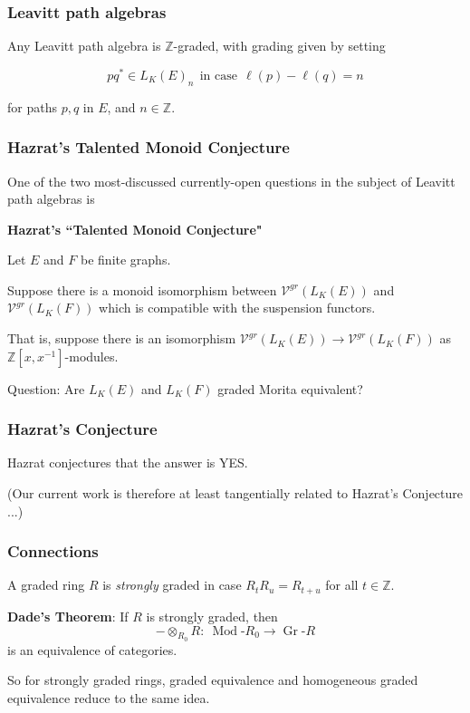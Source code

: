 \documentclass{beamer}
\newcommand{\rmod}[1]{\operatorname{Mod}\text{-}#1}
\newcommand{\grmod}[1]{\operatorname{Gr}\text{-}#1}
\begin{document}
\begin{frame}
\frametitle{Leavitt path algebras}


Any Leavitt path algebra is $\mathbb{Z}$-graded, with grading given by setting

$$pq^* \in L_K(E)_n \ \ \mbox{in case} \ \ \ell(p) - \ell(q) = n$$

\smallskip

for paths $p,q$ in $E$, and $n\in \mathbb{Z}$.  

\end{frame}



\begin{frame}
\frametitle{Hazrat's Talented Monoid Conjecture}

One of the two most-discussed currently-open questions in the subject of Leavitt path algebras is 
\begin{center}
{\bf Hazrat's ``Talented Monoid Conjecture"}
\end{center}
Let $E$ and $F$ be finite graphs.  

\medskip

Suppose there is a monoid isomorphism between $\mathcal{V}^{gr}(L_K(E))$ and $\mathcal{V}^{gr}(L_K(F))$ which is compatible with the suspension functors.

\medskip

That is, suppose  there is an isomorphism $\mathcal{V}^{gr}(L_K(E)) \to \mathcal{V}^{gr}(L_K(F))$ as $\mathbb{Z}[x,x^{-1}]$-modules.   

\bigskip

 Question:   Are $L_K(E)$ and $L_K(F)$ graded Morita equivalent?   
 
 \end{frame}



\begin{frame}
\frametitle{Hazrat's Conjecture}
 
 Hazrat conjectures that the answer is YES.   

\bigskip


(Our current work is therefore at least tangentially related to Hazrat's Conjecture ...)   


\end{frame}



\begin{frame}
\frametitle{Connections}



A graded ring $R$ is {\it strongly} graded in case $R_t R_u = R_{t+u}$ for all $t \in \mathbb{Z}$.   

\bigskip

{\bf Dade's Theorem}:   If $R$ is strongly graded, then $$- \otimes_{R_0} R: \   \rmod{R_0} \to \grmod{R}$$
 is an equivalence of categories.



\bigskip

So for strongly graded rings, graded equivalence and homogeneous graded equivalence reduce to the same idea.  


\end{frame}
\end{document}
